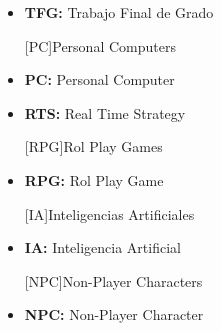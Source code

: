 \begin{itemize}

[TFG]{Trabajos Finales de Grado}
\item \textbf{TFG:} Trabajo Final de Grado

[PC]{Personal Computers}
\item \textbf{PC:} Personal Computer

\item \textbf{RTS:} Real Time Strategy

[RPG]{Rol Play Games}
\item \textbf{RPG:} Rol Play Game

[IA]{Inteligencias Artificiales}
\item \textbf{IA:} Inteligencia Artificial

[NPC]{Non-Player Characters}
\item \textbf{NPC:} Non-Player Character





\end{itemize}